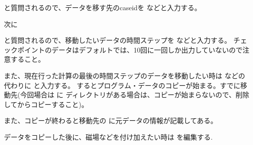 \documentclass[letterpaper,10pt,dvipdfmx,report]{sphinxmanual}
\begin{document}
\sphinxAtStartPar
と質問されるので、データを移す先のcaseidを  などと入力する。

\sphinxAtStartPar
次に

\begin{sphinxVerbatim}[commandchars=\\\{\}]
         
\end{sphinxVerbatim}

\sphinxAtStartPar
と質問されるので、移動したいデータの時間ステップを  などと入力する。
チェックポイントのデータはデフォルトでは、10回に一回しか出力していないので注意すること。

\sphinxAtStartPar
また、現在行った計算の最後の時間ステップのデータを移動したい時は  などの代わりに
 と入力する。
するとプログラム・データのコピーが始まる。すでに移動先(今回場合は  に  ディレクトリがある場合は、コピーが始まらないので、削除してからコピーすること)。

\sphinxAtStartPar
また、コピーが終わると移動先の  に元データの情報が記載してある。

\sphinxAtStartPar
データをコピーした後に、磁場などを付け加えたい時は  を編集する.

\begin{sphinxVerbatim}[commandchars=\\\{\}]
\end{sphinxVerbatim}
\end{document}
